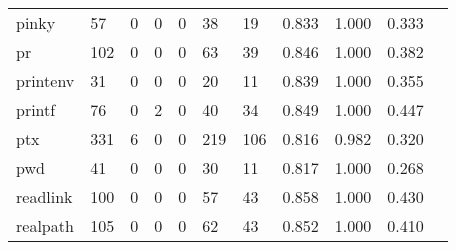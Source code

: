 \begin{longtable}{lp{1.10cm}p{1.10cm}p{1.10cm}p{1.10cm}p{1.10cm}p{1.10cm}p{1.10cm}p{1.10cm}p{1.10cm}p{1.10cm}}
pinky     &                     57 &                                  0 &                                 0 &                                0 &                                38 &                              19 &                          0.833 &                                 1.000 &                               0.333 \\
pr        &                    102 &                                  0 &                                 0 &                                0 &                                63 &                              39 &                          0.846 &                                 1.000 &                               0.382 \\
printenv  &                     31 &                                  0 &                                 0 &                                0 &                                20 &                              11 &                          0.839 &                                 1.000 &                               0.355 \\
printf    &                     76 &                                  0 &                                 2 &                                0 &                                40 &                              34 &                          0.849 &                                 1.000 &                               0.447 \\
ptx       &                    331 &                                  6 &                                 0 &                                0 &                               219 &                             106 &                          0.816 &                                 0.982 &                               0.320 \\
pwd       &                     41 &                                  0 &                                 0 &                                0 &                                30 &                              11 &                          0.817 &                                 1.000 &                               0.268 \\
readlink  &                    100 &                                  0 &                                 0 &                                0 &                                57 &                              43 &                          0.858 &                                 1.000 &                               0.430 \\
realpath  &                    105 &                                  0 &                                 0 &                                0 &                                62 &                              43 &                          0.852 &                                 1.000 &                               0.410 \\

\end{longtable}
